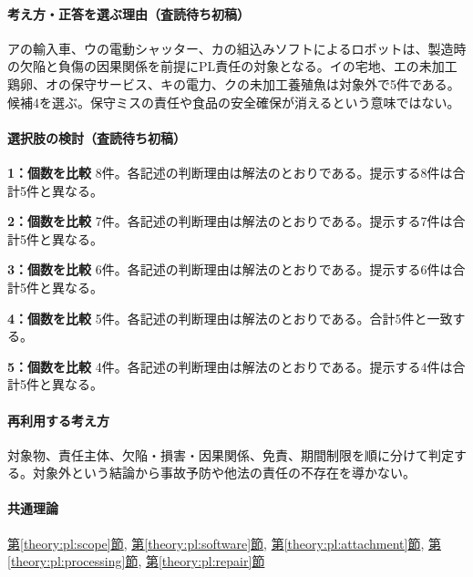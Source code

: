 \paragraph{考え方・正答を選ぶ理由（査読待ち初稿）} アの輸入車、ウの電動シャッター、カの組込みソフトによるロボットは、製造時の欠陥と負傷の因果関係を前提にPL責任の対象となる。イの宅地、エの未加工鶏卵、オの保守サービス、キの電力、クの未加工養殖魚は対象外で5件である。候補4を選ぶ。保守ミスの責任や食品の安全確保が消えるという意味ではない。

\paragraph{選択肢の検討（査読待ち初稿）}\mbox{}\par

\noindent\textbf{1：個数を比較} 8件。各記述の判断理由は解法のとおりである。提示する8件は合計5件と異なる。\par

\noindent\textbf{2：個数を比較} 7件。各記述の判断理由は解法のとおりである。提示する7件は合計5件と異なる。\par

\noindent\textbf{3：個数を比較} 6件。各記述の判断理由は解法のとおりである。提示する6件は合計5件と異なる。\par

\noindent\textbf{4：個数を比較} 5件。各記述の判断理由は解法のとおりである。合計5件と一致する。\par

\noindent\textbf{5：個数を比較} 4件。各記述の判断理由は解法のとおりである。提示する4件は合計5件と異なる。\par

\paragraph{再利用する考え方} 対象物、責任主体、欠陥・損害・因果関係、免責、期間制限を順に分けて判定する。対象外という結論から事故予防や他法の責任の不存在を導かない。

\paragraph{共通理論} \hyperref[theory:pl:scope]{第\ref*{theory:pl:scope}節}, \hyperref[theory:pl:software]{第\ref*{theory:pl:software}節}, \hyperref[theory:pl:attachment]{第\ref*{theory:pl:attachment}節}, \hyperref[theory:pl:processing]{第\ref*{theory:pl:processing}節}, \hyperref[theory:pl:repair]{第\ref*{theory:pl:repair}節}

